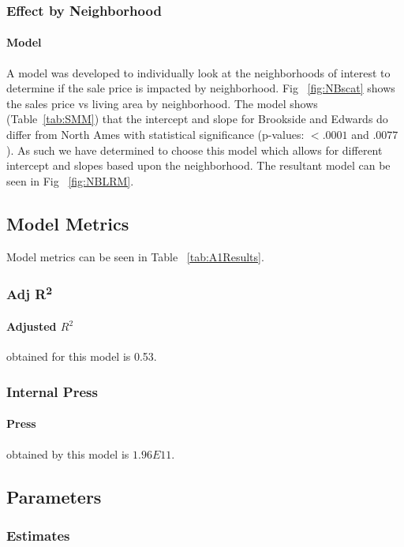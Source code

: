 \documentclass[11pt]{scrartcl} %
\begin{document}
\subsubsection{Effect by Neighborhood}
\paragraph{Model} A model was developed to individually look at the neighborhoods of interest to determine if the sale price is impacted by neighborhood. Fig ~\ref{fig:NBscat} shows the sales price vs living area by neighborhood. The model shows (Table~\ref{tab:SMM}) that the intercept and slope for Brookside and Edwards do differ from North Ames with statistical significance (p-values: $<.0001$ and $.0077$). As such we have determined to choose this model which allows for different intercept and slopes based upon the neighborhood. The resultant model can be seen in Fig ~\ref{fig:NBLRM}.


\subsection{Model Metrics}
Model metrics can be seen in Table ~\ref{tab:A1Results}.
\subsubsection{Adj R\textsuperscript{2}} 
\paragraph{Adjusted $R^2$} obtained for this model is 0.53.
\subsubsection{Internal Press} 
\paragraph{Press} obtained by this model is $1.96E11$.

\subsection{Parameters}
\subsubsection{Estimates}
\end{document}
